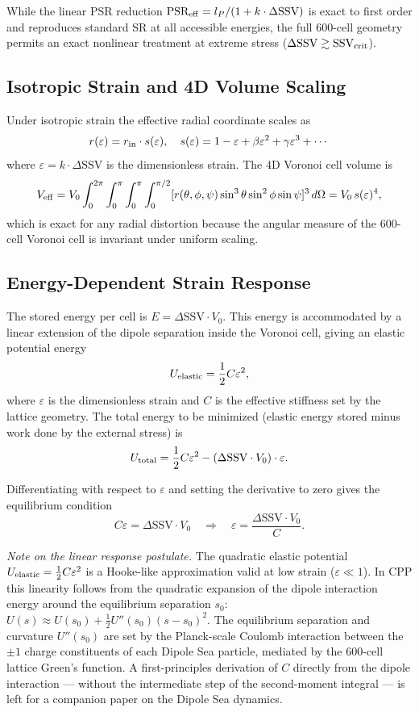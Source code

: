 \documentclass[11pt,letterpaper]{article}
\begin{document}
While the linear PSR reduction \(\text{PSR}_{\rm eff} = l_P / (1 + k \cdot \Delta\text{SSV})\) is exact to first order and reproduces standard SR at all accessible energies, the full 600-cell geometry permits an exact nonlinear treatment at extreme stress (\(\Delta\text{SSV} \gtrsim \text{SSV}_{\rm crit}\)).

\subsection{Isotropic Strain and 4D Volume Scaling}

Under isotropic strain the effective radial coordinate scales as
\[
r(\varepsilon) = r_{\rm in} \cdot s(\varepsilon), \quad s(\varepsilon) = 1 - \varepsilon + \beta \varepsilon^2 + \gamma \varepsilon^3 + \cdots
\]
where \(\varepsilon = k \cdot \Delta\text{SSV}\) is the dimensionless strain. The 4D Voronoi cell volume is
\[
V_{\rm eff} = V_0 \int_0^{2\pi} \int_0^\pi \int_0^\pi \int_0^{\pi/2} [r(\theta,\phi,\psi) \sin^3\theta \sin^2\phi \sin\psi]^3 \, d\Omega = V_0 \, s(\varepsilon)^4,
\]
which is exact for any radial distortion because the angular measure of the 600-cell Voronoi cell is invariant under uniform scaling.

\subsection{Energy-Dependent Strain Response}

The stored energy per cell is \(E = \Delta\text{SSV} \cdot V_0\). This energy is accommodated by a linear extension of the dipole separation inside the Voronoi cell, giving an elastic potential energy
\[
U_{\rm elastic} = \frac{1}{2} C \varepsilon^2,
\]
where \(\varepsilon\) is the dimensionless strain and \(C\) is the effective stiffness set by the lattice geometry. The total energy to be minimized (elastic energy stored minus work done by the external stress) is
\[
U_{\rm total} = \frac{1}{2} C \varepsilon^2 - (\Delta\text{SSV} \cdot V_0) \cdot \varepsilon.
\]

Differentiating with respect to \(\varepsilon\) and setting the derivative to zero gives the equilibrium condition
\[
C \varepsilon = \Delta\text{SSV} \cdot V_0 \quad \Rightarrow \quad \varepsilon = \frac{\Delta\text{SSV} \cdot V_0}{C}.
\]

\textit{Note on the linear response postulate.} The quadratic elastic potential $U_{\rm elastic} = \frac{1}{2}C\varepsilon^2$ is a Hooke-like approximation valid at low strain ($\varepsilon \ll 1$). In CPP this linearity follows from the quadratic expansion of the dipole interaction energy around the equilibrium separation $s_0$: $U(s) \approx U(s_0) + \frac{1}{2}U''(s_0)(s-s_0)^2$. The equilibrium separation and curvature $U''(s_0)$ are set by the Planck-scale Coulomb interaction between the $\pm 1$ charge constituents of each Dipole Sea particle, mediated by the 600-cell lattice Green's function. A first-principles derivation of $C$ directly from the dipole interaction — without the intermediate step of the second-moment integral — is left for a companion paper on the Dipole Sea dynamics.
\end{document}
